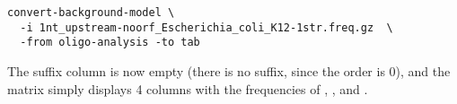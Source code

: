 \begin{small}
\begin{verbatim}
convert-background-model \
  -i 1nt_upstream-noorf_Escherichia_coli_K12-1str.freq.gz  \
  -from oligo-analysis -to tab
\end{verbatim}
\end{small}

The suffix column is now empty (there is no suffix, since the order is
0), and the matrix simply displays 4 columns with the frequencies of
\seq{A}, \seq{C}, \seq{G} and \seq{T}.
